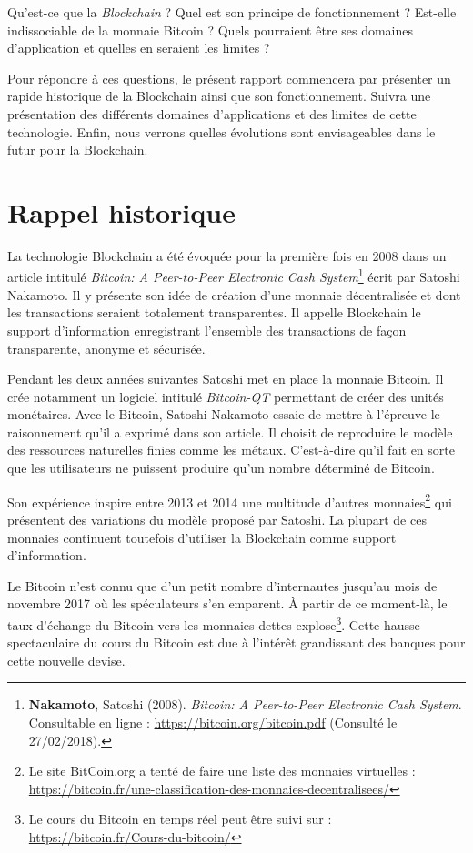 \documentclass{article}
\begin{document}
Qu'est-ce que la \textit{Blockchain} ? Quel est son principe de fonctionnement ? Est-elle indissociable de la monnaie Bitcoin ? Quels pourraient être ses domaines d'application et quelles en seraient les limites ?

Pour répondre à ces questions, le présent rapport commencera par présenter un rapide historique de la Blockchain ainsi que son fonctionnement. Suivra une présentation des différents domaines d'applications et des limites de cette technologie. Enfin, nous verrons quelles évolutions sont envisageables dans le futur pour la Blockchain.


\section{Rappel historique}

La technologie Blockchain a été évoquée pour la première fois en 2008 dans un article intitulé \textit{Bitcoin: A Peer-to-Peer Electronic Cash System}\footnote{\textbf{Nakamoto}, Satoshi (2008). \textit{Bitcoin: A Peer-to-Peer Electronic Cash System}. Consultable en ligne : \url{https://bitcoin.org/bitcoin.pdf} (Consulté le 27/02/2018).} écrit par Satoshi Nakamoto. Il y présente son idée de création d'une monnaie décentralisée et dont les transactions seraient totalement transparentes. Il appelle Blockchain le support d'information enregistrant l'ensemble des transactions de façon transparente, anonyme et sécurisée.

Pendant les deux années suivantes Satoshi met en place la monnaie Bitcoin. Il crée notamment un logiciel intitulé \textit{Bitcoin-QT} permettant de créer des unités monétaires. Avec le Bitcoin, Satoshi Nakamoto essaie de mettre à l'épreuve le raisonnement qu'il a exprimé dans son article. Il choisit de reproduire le modèle des ressources naturelles finies comme les métaux. C'est-à-dire qu'il fait en sorte que les utilisateurs ne puissent produire qu'un nombre déterminé de Bitcoin.

Son expérience inspire entre 2013 et 2014 une multitude d'autres monnaies\footnote{Le site BitCoin.org a tenté de faire une liste des monnaies virtuelles : \url{https://bitcoin.fr/une-classification-des-monnaies-decentralisees/}} qui présentent des variations du modèle proposé par Satoshi. La plupart de ces monnaies continuent toutefois d'utiliser la Blockchain comme support d'information.

Le Bitcoin n'est connu que d'un petit nombre d'internautes jusqu'au mois de novembre 2017 où les spéculateurs s'en emparent. À partir de ce moment-là, le taux d'échange du Bitcoin vers les monnaies dettes explose\footnote{Le cours du Bitcoin en temps réel peut être suivi sur : \url{https://bitcoin.fr/Cours-du-bitcoin/}}. Cette hausse spectaculaire du cours du Bitcoin est due à l'intérêt grandissant des banques pour cette nouvelle devise.
\end{document}
